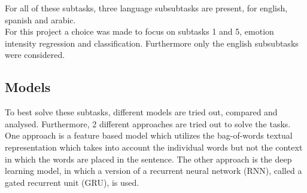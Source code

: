 For all of these subtasks, three language subsubtasks are present, for english, spanish and arabic.\\ 
For this project a choice was made to focus on subtasks 1 and 5, emotion intensity regression and classification. Furthermore only the  english subsubtasks were considered.
\subsection{Models}
To best solve these subtasks, different models are tried out, compared and analysed. Furthermore, 2 different approaches are tried out to solve the tasks. One approach is a feature based model which utilizes the bag-of-words textual representation which takes into account the individual words but not the context in which the words are placed in the sentence. The other approach is the deep learning model, in which a version of a recurrent neural network (RNN), called a gated recurrent unit (GRU), is used.

